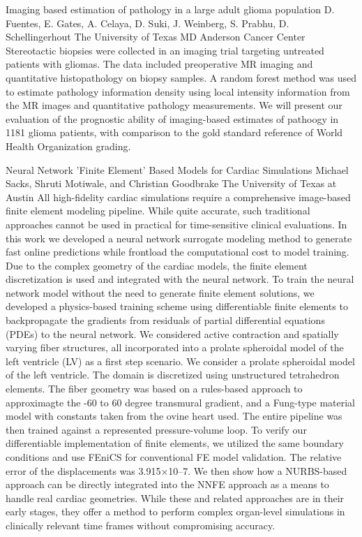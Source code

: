 \begin{addmargin}[2em]{0em}
\vspace{1.5ex}
\abs
{Imaging based estimation of pathology in a large adult glioma population}
{D. Fuentes, E. Gates, A. Celaya, D. Suki, J. Weinberg, S. Prabhu, D. Schellingerhout}
{The University of Texas MD Anderson Cancer Center}
{Stereotactic biopsies were collected in an imaging trial targeting untreated patients with gliomas. The data included preoperative MR imaging and quantitative histopathology on biopsy samples. A random forest method was used to estimate pathology information density using local intensity information from the MR images and quantitative pathology measurements.  We will present our evaluation of the prognostic ability of imaging-based estimates of pathoogy in 1181 glioma patients, with comparison to the gold standard reference of World Health Organization grading.}


\vspace{1.5ex}
\abs
{Neural Network ’Finite Element’ Based Models for Cardiac Simulations}
{Michael Sacks, Shruti Motiwale, and Christian Goodbrake}
{The University of Texas at Austin}
{All high-fidelity cardiac simulations require a comprehensive image-based finite element modeling pipeline. While quite accurate, such traditional approaches cannot be used in practical for time-sensitive clinical evaluations. In this work we developed a neural network surrogate modeling method to generate fast online predictions while frontload the computational cost to model training. Due to the complex geometry of the cardiac models, the finite element discretization is used and integrated with the neural network. To train the neural network model without the need to generate finite element solutions, we developed a physics-based training scheme using differentiable finite elements to backpropagate the gradients from residuals of partial differential equations (PDEs) to the neural network. We considered active contraction and spatially varying fiber structures, all incorporated into a prolate spheroidal model of the left ventricle (LV) as a first step scenario. We consider a prolate spheroidal model of the left ventricle. The domain is discretized using unstructured tetrahedron elements. The fiber geometry was based on a rules-based approach to approximagte the -60 to 60 degree transmural gradient, and a Fung-type material model with constants taken from the ovine heart used.  The entire pipeline was then trained against a represented pressure-volume loop. To verify our differentiable implementation of finite elements, we utilized the same boundary conditions and use FEniCS for conventional FE model validation. The relative error of the displacements was 3.915×10–7. We then show how a NURBS-based approach can be directly integrated into the NNFE approach as a means to handle real cardiac geometries.  While these and related approaches are in their early stages, they offer a method to perform complex organ-level simulations in clinically relevant time frames without compromising accuracy.}
\end{addmargin}
